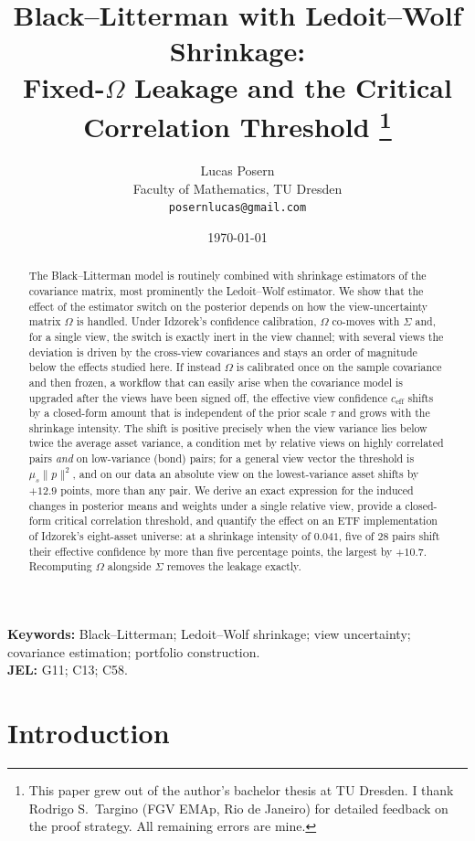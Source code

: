 \documentclass[a4paper,11pt]{article}
\title{Black--Litterman with Ledoit--Wolf Shrinkage:\\
Fixed-$\Omega$ Leakage and the Critical Correlation Threshold%
\thanks{This paper grew out of the author's bachelor thesis at TU Dresden.
I thank Rodrigo S.~Targino (FGV EMAp, Rio de Janeiro) for detailed feedback
on the proof strategy. All remaining errors are mine.}}
\author{Lucas Posern\\
\small Faculty of Mathematics, TU Dresden\\
\small \texttt{posernlucas@gmail.com}}
\date{\today}
\theoremstyle{plain}
\theoremstyle{definition}
\newcommand{\eff}{\mathrm{eff}}
\begin{document}
\maketitle

\begin{abstract}
\noindent
The Black--Litterman model is routinely combined with shrinkage estimators
of the covariance matrix, most prominently the Ledoit--Wolf estimator.
We show that the effect of the estimator switch on the posterior depends
on how the view-uncertainty matrix $\Omega$ is handled. Under
Idzorek's confidence calibration, $\Omega$ co-moves with $\Sigma$ and, for
a single view, the switch is exactly inert in the view channel; with
several views the deviation is driven by the cross-view covariances and
stays an order of magnitude below the effects studied here. If instead
$\Omega$ is calibrated once on the sample covariance and then frozen, a
workflow that can easily arise when the covariance model is upgraded after
the views have been signed off, the effective view confidence
$c_{\eff}$ shifts by a closed-form amount that is independent of the prior
scale $\tau$ and grows with the shrinkage intensity. The shift is positive
precisely when the view variance lies below twice the average asset
variance, a condition met by relative views on highly correlated pairs
\emph{and} on low-variance (bond) pairs; for a general view vector the
threshold is $\mu_s\lVert p\rVert^2$, and on our data an absolute view
on the lowest-variance asset shifts by $+12.9$ points, more than any
pair. We derive an exact expression for
the induced changes in posterior means and weights under a single relative
view, provide a closed-form critical correlation threshold, and quantify
the effect on an ETF implementation of Idzorek's eight-asset universe: at
a shrinkage intensity of $0.041$, five of 28 pairs shift their effective
confidence by more than five percentage points, the largest by $+10.7$.
Recomputing $\Omega$ alongside $\Sigma$ removes the leakage exactly.
\end{abstract}

\medskip
\noindent\textbf{Keywords:} Black--Litterman; Ledoit--Wolf shrinkage;
view uncertainty; covariance estimation; portfolio construction.\\
\textbf{JEL:} G11; C13; C58.

\section{Introduction}
\label{sec:intro}
\end{document}
